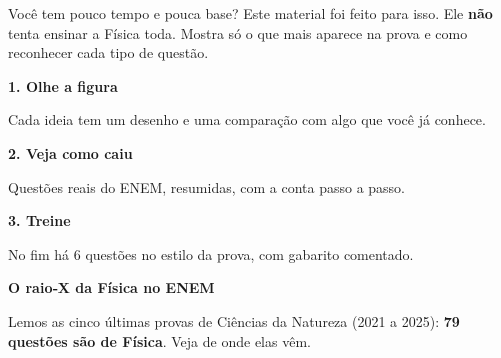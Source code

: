 
Você tem pouco tempo e pouca base? Este material foi feito para isso. Ele \textbf{não} tenta ensinar a Física toda.
Mostra só o que mais aparece na prova e como reconhecer cada tipo de questão.

\begin{tcolorbox}[base,colback=cinzaclaro,colframe=cinzaclaro]
\newcommand{\passocomo}[4]{\begin{minipage}[t]{0.31\linewidth}\centering
  \parbox[c][9mm][c]{\linewidth}{\centering\Huge\color{#1}#2}\par \textbf{#3}\par {\small #4}\end{minipage}}
\passocomo{corA}{\faEye}{1. Olhe a figura}{Cada ideia tem um desenho e uma comparação com algo que você já conhece.}\hfill
\passocomo{corB}{\faGraduationCap}{2. Veja como caiu}{Questões reais do ENEM, resumidas, com a conta passo a passo.}\hfill
\passocomo{corC}{\faPencil*}{3. Treine}{No fim há 6 questões no estilo da prova, com gabarito comentado.}
\end{tcolorbox}

\vspace{1mm}
{\fontsize{24}{27}\selectfont\bfseries O raio‑X da Física no ENEM}\par\vspace{1mm}
Lemos as cinco últimas provas de Ciências da Natureza (2021 a 2025): \textbf{79 questões são de Física}.
Veja de onde elas vêm.

\vspace{2mm}
\begin{minipage}[t]{0.235\linewidth}\end{minipage}\hfill
\begin{minipage}[t]{0.235\linewidth}\end{minipage}\hfill
\begin{minipage}[t]{0.235\linewidth}\end{minipage}\hfill
\begin{minipage}[t]{0.235\linewidth}\end{minipage}

